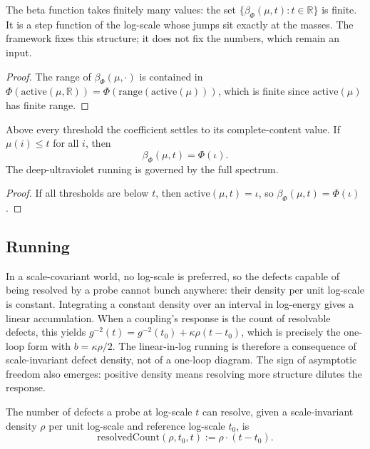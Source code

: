 \begin{theorem}
The beta function takes finitely many values: the set $\{\beta_\Phi(\mu, t) : t \in \mathbb{R}\}$ is finite. It is a step function of the log-scale whose jumps sit exactly at the masses. The framework fixes this structure; it does not fix the numbers, which remain an input.
\end{theorem}

\begin{proof}
The range of $\beta_\Phi(\mu, \cdot)$ is contained in $\Phi(\text{active}(\mu, \mathbb{R})) = \Phi(\text{range}(\text{active}(\mu)))$, which is finite since $\text{active}(\mu)$ has finite range.
\end{proof}

\begin{theorem}
Above every threshold the coefficient settles to its complete-content value. If $\mu(i) \leq t$ for all $i$, then
\begin{equation}
\beta_\Phi(\mu, t) = \Phi(\iota) .
\end{equation}
The deep-ultraviolet running is governed by the full spectrum.
\end{theorem}

\begin{proof}
If all thresholds are below $t$, then $\text{active}(\mu, t) = \iota$, so $\beta_\Phi(\mu, t) = \Phi(\iota)$.
\end{proof}

\subsection{Running}

In a scale-covariant world, no log-scale is preferred, so the defects capable of being resolved by a probe cannot bunch anywhere: their density per unit log-scale is constant. Integrating a constant density over an interval in log-energy gives a linear accumulation. When a coupling's response is the count of resolvable defects, this yields $g^{-2}(t) = g^{-2}(t_0) + \kappa\rho(t - t_0)$, which is precisely the one-loop form with $b = \kappa\rho/2$. The linear-in-log running is therefore a consequence of scale-invariant defect density, not of a one-loop diagram. The sign of asymptotic freedom also emerges: positive density means resolving more structure dilutes the response.

\begin{definition}
The number of defects a probe at log-scale $t$ can resolve, given a scale-invariant density $\rho$ per unit log-scale and reference log-scale $t_0$, is
\begin{equation}
\text{resolvedCount}(\rho, t_0, t) := \rho \cdot (t - t_0) .
\end{equation}
\end{definition}

